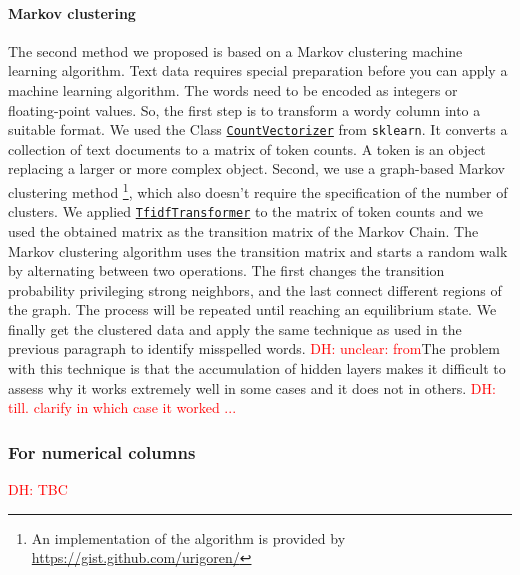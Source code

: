 \documentclass{article}
\newcommand\dhawat[1]{\textcolor{red}{DH: #1}}
\begin{document}
\paragraph{Markov clustering}
The second method we proposed is based on a Markov clustering machine learning algorithm.
Text data requires special preparation before you can apply a machine learning algorithm.
The words need to be encoded as integers or floating-point values.
So, the first step is to transform a wordy column into a suitable format.
We used the Class \href{https://scikit-learn.org/stable/modules/generated/sklearn.feature_extraction.text.CountVectorizer.html}{\texttt{CountVectorizer}} from \texttt{sklearn}.
It converts a collection of text documents to a matrix of token counts.
A token is an object replacing a larger or more complex object.
Second, we use a graph-based Markov clustering method \footnote{An implementation of the algorithm is provided by \href{https://gist.github.com/urigoren/1f76567f3af56ed8c33f076537768a60}{https://gist.github.com/urigoren/}}, which also doesn't require the specification of the number of clusters.
We applied \href{https://scikit-learn.org/stable/modules/generated/sklearn.feature_extraction.text.TfidfTransformer.html}{\texttt{TfidfTransformer}} to the matrix of token counts and we used the obtained matrix as the transition matrix of the Markov Chain.
The Markov clustering algorithm uses the transition matrix and starts a random walk by alternating between two operations.
The first changes the transition probability privileging strong neighbors, and the last connect different regions of the graph.
The process will be repeated until reaching an equilibrium state.
We finally get the clustered data and apply the same technique as used in the previous paragraph to identify misspelled words.
\dhawat{unclear: from}The problem with this technique is that the accumulation of hidden layers makes it difficult to assess why it works extremely well in some cases and it does not in others. \dhawat{till. clarify in which case it worked ...}
\subsubsection{For numerical columns} %
\label{ssub:For numerical columns}
\dhawat{TBC}
\end{document}
